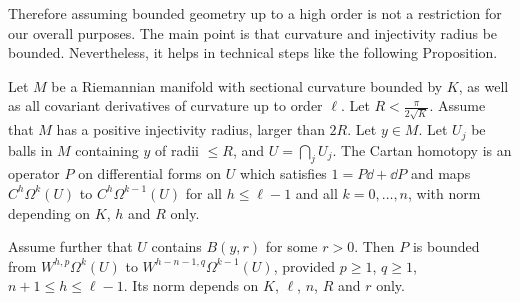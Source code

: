 Therefore assuming bounded geometry up to a high order is not a restriction for our overall purposes. The main point is that curvature and injectivity radius be bounded. Nevertheless, it helps in technical steps like the following Proposition.

\begin{prop}\label{local}
Let $M$ be a Riemannian manifold with sectional curvature bounded by $K$, as well as all covariant derivatives of curvature up to order $\ell$. Let $R<\frac{\pi}{2\sqrt{K}}$. Assume that $M$ has a positive injectivity radius, larger than $2R$. Let $y\in M$. Let $U_j$ be balls in $M$ containing $y$ of radii $\leq R$, and $U=\bigcap_j U_j$. The Cartan homotopy is an operator $P$ on differential forms on $U$ which satisfies $1=P\dd+\dd P$ and maps $C^h\Omega^{k}(U)$ to $C^h\Omega^{k-1}(U)$ for all $h\leq \ell -1$ and all $k=0,\dots,n$, with norm depending on $K$, $h$ and $R$ only.

Assume further that $U$ contains $B(y,r)$ for some $r>0$. Then $P$ is bounded from $W^{h,p}\Omega^{k}(U)$ to $W^{h -n-1,q}\Omega^{k-1}(U)$, provided $p\geq 1$, $q\geq 1$, $n+1 \leq h \leq \ell-1$. Its norm depends on $K$, $\ell$, $n$, $R$ and $r$ only.
\end{prop}

